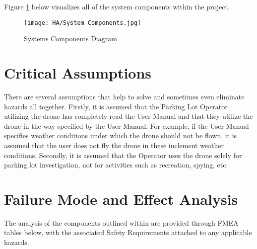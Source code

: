 \documentclass{article}
\begin{document}
\clearpage
Figure \ref{fig:SystemCompDiagram} below visualizes all of the system components within the project. 


\begin{figure}[!h]
    \centering
    \texttt{[image: HA/System Components.jpg]}
    \caption{Systems Components Diagram}
    \label{fig:SystemCompDiagram}
\end{figure}




\section{Critical Assumptions}
There are several assumptions that help to solve and sometimes even eliminate hazards all together. Firstly, it is assumed that the Parking Lot Operator utilizing the drone has completely read the User Manual and that they utilize the drone in the way specified by the User Manual. For example, if the User Manual specifies weather conditions under which the drone should not be flown, it is assumed that the user does not fly the drone in these inclement weather conditions. Secondly, it is assumed that the Operator uses the drone solely for parking lot investigation, not for activities such as recreation, spying, etc.  



\section{Failure Mode and Effect Analysis}

The analysis of the components outlined within  are provided through FMEA tables below, with the associated Safety Requirements attached to any applicable hazards.
\end{document}

